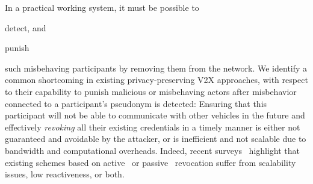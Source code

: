In a practical working system, it must be possible to 
\begin{inparaenum}
    \item detect, and
    \item punish 
\end{inparaenum}
such misbehaving participants by removing them from the network.
%
We identify a
common shortcoming in existing privacy-preserving \ac{V2X} approaches, with
respect to their capability to punish malicious or misbehaving actors after
misbehavior connected to a participant's pseudonym is detected:
Ensuring that this participant will not be able to communicate with other
vehicles in the future and effectively \emph{revoking} all their existing
credentials in a timely manner is either not guaranteed and avoidable by the
attacker, or is inefficient and not scalable due to bandwidth and computational
overheads.
%
Indeed, recent surveys~\cite{yoshizawa2022v2x_survey,wang2020certificate}
highlight that existing schemes based on active~\cite{brecht2018scms} or
passive~\cite{etsi2022102941} revocation suffer from scalability issues, low
reactiveness, or both.

